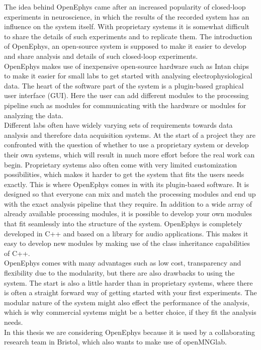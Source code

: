 The idea behind OpenEphys came after an increased popularity of closed-loop experiments in neuroscience, in which the results of the recorded system has an influence on the system itself. With proprietary systems it is somewhat difficult to share the details of such experiments and to replicate them. The introduction of OpenEphys, an open-source system is supposed to make it easier to develop and share analysis and details of such closed-loop experiments.\\
OpenEphys makes use of inexpensive open-source hardware such as Intan chips to make it easier for small labs to get started with analysing electrophysiological data. The heart of the software part of the system is a plugin-based graphical user interface (GUI). Here the user can add different modules to the processing pipeline such as modules for communicating with the hardware or modules for analyzing the data.\\
Different labs often have widely varying sets of requirements towards data analysis and therefore data acquisition systems. At the start of a project they are confronted with the question of whether to use a proprietary system or develop their own systems, which will result in much more effort before the real work can begin. Proprietary systems also often come with very limited customization possibilities, which makes it harder to get the system that fits the users needs exactly. This is where OpenEphys comes in with its plugin-based software. It is designed so that everyone can mix and match the processing modules and end up with the exact analysis pipeline that they require. In addition to a wide array of already available processing modules, it is possible to develop your own modules that fit seamlessly into the structure of the system. OpenEphys is completely developed in C++ and based on a library for audio applications. This makes it easy to develop new modules by making use of the class inheritance capabilities of C++.\\
OpenEphys comes with many advantages such as low cost, transparency and flexibility due to the modularity, but there are also drawbacks to using the system. The start is also a little harder than in proprietary systems, where there is often a straight forward way of getting started with your first experiments. The modular nature of the system might also effect the performance of the analysis, which is why commercial systems might be a better choice, if they fit the analysis needs.\\

In this thesis we are considering OpenEphys because it is used by a collaborating research team in Bristol, which also wants to make use of openMNGlab.



 
\cleardoublepage

